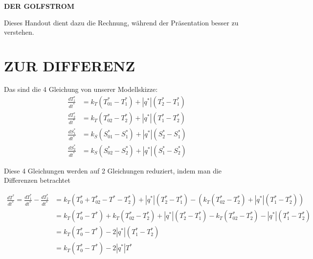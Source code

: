 \documentclass[a4paper,twoside]{article}
\begin{document}
	
	\begin{center}
	\begin{LARGE}
			\uppercase{\textbf{Der Golfstrom}} \\[12pt] 
	\end{LARGE}
	\end{center}

	
	
	Dieses Handout dient dazu die Rechnung, während der Präsentation besser zu verstehen.
	
	\section*{\uppercase{Zur Differenz}\label{sec: Differenz}}
	
	\begin{footnotesize}
	\noindent Das sind die 4 Gleichung von unserer Modellskizze:
	\begin{align*}
		\frac{dT^*_1}{dt^*} &= k_T\left(T^*_{01} - T^*_1\right) + \left|q^*\right|\left(T^*_2 - T^*_1\right) \\
		\frac{dT^*_2}{dt^*} &= k_T\left(T^*_{02} - T^*_2\right) + \left|q^*\right|\left(T^*_1 - T^*_2\right) \\
		\frac{dS^*_1}{dt^*} &= k_S\left(S^*_{01} - S^*_1\right) + \left|q^*\right|\left(S^*_2 - S^*_1\right) \\
		\frac{dS^*_2}{dt^*} &= k_S\left(S^*_{02} - S^*_2\right) + \left|q^*\right|\left(S^*_1 - S^*_2\right)
	\end{align*}
	\end{footnotesize}
	
	\noindent Diese 4 Gleichungen werden auf 2 Gleichungen reduziert, indem man die Differenzen betrachtet
	\begin{footnotesize}
	\begin{align*}
		\frac{dT^*}{dt^*} = \frac{dT^*_1}{dt^*} - \frac{dT^*_2}{dt^*} &= 
		k_T\left(T^*_{0} + T^*_{02} - T^* - T^*_2 \right) + \left|q^*\right|\left(T^*_2 - T^*_1\right)  - \left( k_T\left(T^*_{02} - T^*_2\right) + \left|q^*\right|\left(T^*_1 - T^*_2\right) \right) \\
		&= k_T\left(T^*_{0} - T^*\right) + k_T\left(T^*_{02} - T^*_2\right) + \left|q^*\right|\left(T^*_2 - T^*_1\right) - k_T\left(T^*_{02} - T^*_2\right) - \left|q^*\right|\left(T^*_1 - T^*_2\right) \\
		&= k_T\left(T^*_{0} - T^*\right) - 2\left|q^*\right|\left(T^*_1 - T^*_2\right) \\
		&= k_T\left(T^*_{0} - T^*\right) - 2\left|q^*\right|T^*
	\end{align*}
	\end{footnotesize}
	
\end{document}
